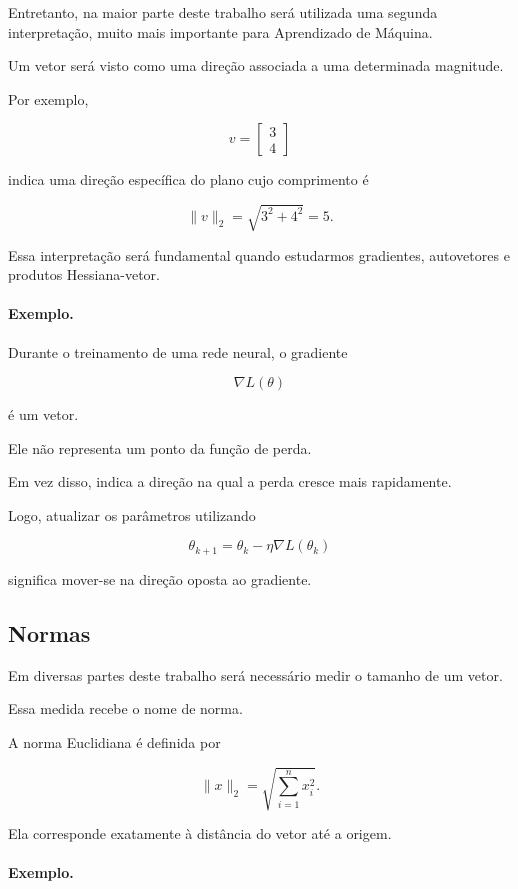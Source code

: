 \documentclass[12pt, a4paper]{article}
\begin{document}
Entretanto, na maior parte deste trabalho será utilizada uma segunda
interpretação, muito mais importante para Aprendizado de Máquina.

Um vetor será visto como uma direção associada a uma determinada magnitude.

Por exemplo,

\[
v=
\begin{bmatrix}
3\\
4
\end{bmatrix}
\]

indica uma direção específica do plano cujo comprimento é

\[
\|v\|_2
=
\sqrt{3^2+4^2}
=
5.
\]

Essa interpretação será fundamental quando estudarmos gradientes,
autovetores e produtos Hessiana-vetor.

\paragraph{Exemplo.}

Durante o treinamento de uma rede neural, o gradiente

\[
\nabla L(\theta)
\]

é um vetor.

Ele não representa um ponto da função de perda.

Em vez disso, indica a direção na qual a perda cresce mais rapidamente.

Logo, atualizar os parâmetros utilizando

\[
\theta_{k+1}
=
\theta_k-\eta\nabla L(\theta_k)
\]

significa mover-se na direção oposta ao gradiente.

\subsection{Normas}

Em diversas partes deste trabalho será necessário medir o tamanho de um vetor.

Essa medida recebe o nome de norma.

A norma Euclidiana é definida por

\[
\|x\|_2
=
\sqrt{\sum_{i=1}^{n}x_i^2}.
\]

Ela corresponde exatamente à distância do vetor até a origem.

\paragraph{Exemplo.}
\end{document}
